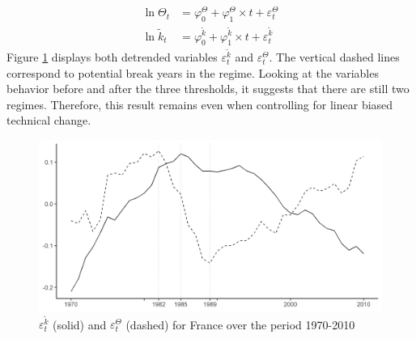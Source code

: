 	\begin{align*}
		\ln \Theta_t &= \varphi_0^\Theta + \varphi_1^\Theta \times t + \varepsilon_t^\Theta \\
		\ln \tilde{k}_t &= \varphi_0^{\tilde{k}} + \varphi_1^{\tilde{k}} \times t + \varepsilon_t^{\tilde{k}}
	\end{align*}
Figure \ref{fig:k_Theta_log_detrend} displays both detrended variables $\varepsilon_t^{\tilde{k}}$ and $\varepsilon_t^\Theta$. The vertical dashed lines correspond to potential break years in the regime. Looking at the variables behavior before and after the three thresholds, it suggests that there are still two regimes. Therefore, this result remains even when controlling for linear biased technical change.
	\begin{figure}[tb]
		\centering
		\includegraphics[width=1\linewidth]{../result/appendix_CD/k_Theta_log_detrend.png}
		\caption{$\varepsilon_t^{\tilde{k}}$ (solid) and $\varepsilon_t^\Theta$ (dashed) for France over the period 1970-2010}
		\label{fig:k_Theta_log_detrend}
	\end{figure}

